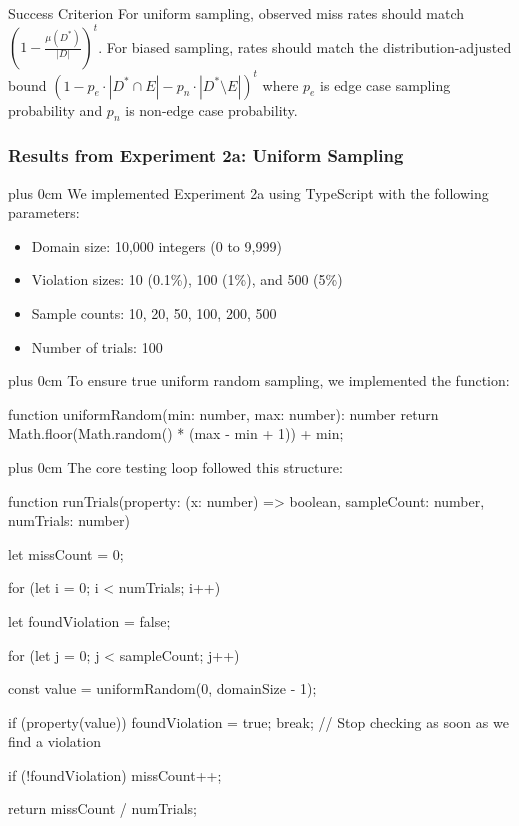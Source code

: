 \documentclass[11pt,a4paper]{article}
\newcommand{\justifytext}{\leftskip=0pt \rightskip=0pt plus 0cm}
\begin{document}
\begin{definitionbox}{Success Criterion}
For uniform sampling, observed miss rates should match $\left(1 - \frac{\mu(D^*)}{|D|}\right)^t$. For biased sampling, rates should match the distribution-adjusted bound $(1 - p_e\cdot|D^*\cap E| - p_n\cdot|D^*\setminus E|)^t$ where $p_e$ is edge case sampling probability and $p_n$ is non-edge case probability.
\end{definitionbox}

\subsubsection{Results from Experiment 2a: Uniform Sampling}

\justifytext
We implemented Experiment 2a using TypeScript with the following parameters:

\begin{itemize}
\item Domain size: 10,000 integers (0 to 9,999)
\item Violation sizes: 10 (0.1\%), 100 (1\%), and 500 (5\%)
\item Sample counts: 10, 20, 50, 100, 200, 500
\item Number of trials: 100
\end{itemize}

\justifytext
To ensure true uniform random sampling, we implemented the function:

\begin{wrappedcode}
function uniformRandom(min: number, max: number): number {
  return Math.floor(Math.random() * (max - min + 1)) + min;
}
\end{wrappedcode}

\justifytext
The core testing loop followed this structure:

\begin{wrappedcode}
function runTrials(property: (x: number) => boolean, sampleCount: number, numTrials: number) {
  let missCount = 0;

  for (let i = 0; i < numTrials; i++) {
    let foundViolation = false;
    
    for (let j = 0; j < sampleCount; j++) {
      const value = uniformRandom(0, domainSize - 1);
      
      if (property(value)) {
        foundViolation = true;
        break; // Stop checking as soon as we find a violation
      }
    }
    
    if (!foundViolation) {
      missCount++;
    }
  }

  return missCount / numTrials;
}
\end{wrappedcode}
\end{document}
